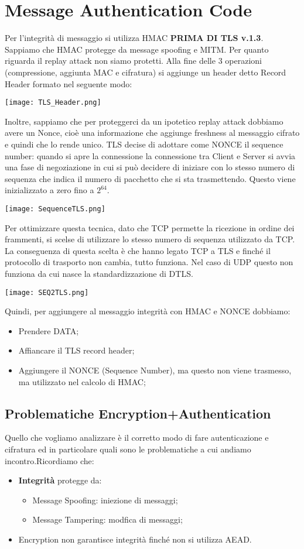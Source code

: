 \documentclass{article}
\theoremstyle{remark}
\begin{document}
\section{Message Authentication Code}
Per l'integrità di messaggio si utilizza HMAC \textbf{PRIMA DI TLS v.1.3}. Sappiamo che HMAC protegge da message spoofing e MITM. Per quanto riguarda il replay attack non siamo protetti. Alla fine delle 3 operazioni (compressione, aggiunta MAC e cifratura) si aggiunge un header detto Record Header formato nel seguente modo:
\begin{center}
	\texttt{[image: TLS\_Header.png]}
\end{center}
Inoltre, sappiamo che per proteggerci da un ipotetico replay attack dobbiamo avere un Nonce, cioè una informazione che aggiunge freshness al messaggio cifrato e quindi che lo rende unico. TLS decise di adottare come NONCE il sequence number: quando si apre la connessione la connessione tra Client e Server si avvia una fase di negoziazione in cui si può decidere di iniziare con lo stesso numero di sequenza che indica il numero di pacchetto che si sta trasmettendo. Questo viene inizializzato a zero fino a $2^{64}$.\newline
\begin{center}
	\texttt{[image: SequenceTLS.png]}
\end{center}
Per ottimizzare questa tecnica, dato che TCP permette la ricezione in ordine dei frammenti, si scelse di utilizzare lo stesso numero di sequenza utilizzato da TCP. La conseguenza di questa scelta è che hanno legato TCP a TLS e finché il protocollo di trasporto non cambia, tutto funziona. Nel caso di UDP questo non funziona da cui nasce la standardizzazione di DTLS.
\begin{center}
	\texttt{[image: SEQ2TLS.png]}
\end{center}
Quindi, per aggiungere al messaggio integrità con HMAC e NONCE dobbiamo:
\begin{itemize}
	\item Prendere DATA;
	\item Affiancare il TLS record header;
	\item Aggiungere il NONCE (Sequence Number), ma questo non viene trasmesso, ma utilizzato nel calcolo di HMAC;
\end{itemize}
\subsection{Problematiche Encryption+Authentication}
Quello che vogliamo analizzare è il corretto modo di fare autenticazione e cifratura ed in particolare quali sono le problematiche a cui andiamo incontro.Ricordiamo che:\begin{itemize}
	\item \textbf{Integrità} protegge da:
	      \begin{itemize}
		      \item Message Spoofing: iniezione di messaggi;
		      \item Message Tampering: modfica di messaggi;
	      \end{itemize}
	\item Encryption non garantisce integrità finché non si utilizza AEAD.
\end{itemize}
\end{document}
